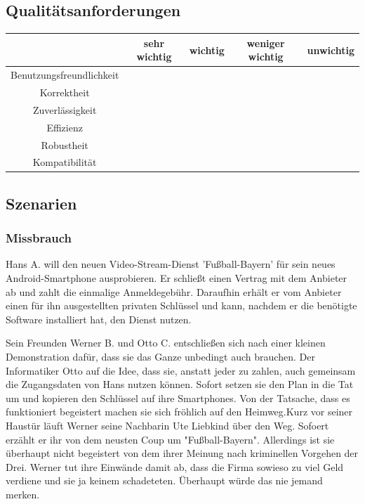\documentclass[a4paper,10pt]{scrartcl}
\begin{document}
\subsection{Qualitätsanforderungen}

\begin{tabular}{|c|c|c|c|c|}
\hline
 & \sffamily \textbf{sehr wichtig}
 & \sffamily \textbf{wichtig}
 & \sffamily \textbf{weniger wichtig}
 & \sffamily \textbf{unwichtig} \\
\hline
Benutzungsfreundlichkeit &  &  \X & & \\
\hline
Korrektheit &  \X & & &  \\
\hline
Zuverlässigkeit &  \X & & & \\
\hline
Effizienz &   \X & & & \\
\hline
Robustheit &  & & &\\
\hline
Kompatibilität &  & & & \\
\hline
\end{tabular}

\subsection{Szenarien}
\subsubsection{Missbrauch}
Hans A. will den neuen Video-Stream-Dienst 'Fußball-Bayern' für sein neues Android-Smartphone ausprobieren. Er schließt einen Vertrag mit dem Anbieter ab und zahlt die einmalige Anmeldegebühr. Daraufhin erhält er vom Anbieter einen für ihn ausgestellten privaten Schlüssel und kann, nachdem er die benötigte Software installiert hat, den Dienst nutzen.

Sein Freunden Werner B. und Otto C. entschließen sich nach einer kleinen Demonstration dafür, dass sie das Ganze unbedingt auch brauchen. Der Informatiker Otto auf die Idee, dass sie, anstatt jeder zu zahlen, auch gemeinsam die Zugangsdaten von Hans nutzen können. Sofort setzen sie den Plan in die Tat um und kopieren den Schlüssel auf ihre Smartphones. Von der Tatsache, dass es funktioniert begeistert machen sie sich fröhlich auf den Heimweg.Kurz vor seiner Haustür läuft Werner seine Nachbarin Ute Liebkind über den Weg. Sofoert erzählt er ihr von dem neusten Coup um "Fußball-Bayern". Allerdings ist sie überhaupt nicht begeistert von dem ihrer Meinung nach kriminellen Vorgehen der Drei. Werner tut ihre Einwände damit ab, dass die Firma sowieso zu viel Geld verdiene und sie ja keinem schadeteten. Überhaupt würde das nie jemand merken. 
\end{document}
